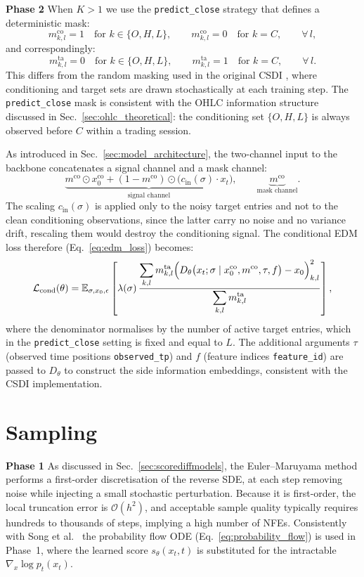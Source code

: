 \textbf{Phase 2} \quad When \(K>1\) we use the \texttt{predict\_close} strategy that defines a deterministic mask:
\[
    m^{\text{co}}_{k,l} = 1 \quad \text{for } k \in \{O,H,L\}, 
    \qquad
    m^{\text{co}}_{k,l} = 0 \quad \text{for } k = C, 
    \qquad \forall\, l,
\]
and correspondingly:
\[
    m^{\text{ta}}_{k,l} = 0 \quad \text{for } k \in \{O,H,L\}, 
    \qquad
    m^{\text{ta}}_{k,l} = 1 \quad \text{for } k = C, 
    \qquad \forall\, l.
\]
This differs from the random masking used in the original CSDI 
\cite{tashiro2021csdi}, where conditioning and target sets are drawn 
stochastically at each training step. The \texttt{predict\_close} mask is consistent with 
the OHLC information structure discussed in 
Sec.\ \ref{sec:ohlc_theoretical}: the conditioning set \(\{O,H,L\}\) 
is always observed before \(C\) within a trading session.

As introduced in Sec.\ \ref{sec:model_architecture}, the two-channel 
input to the backbone concatenates a signal channel and a mask channel:
\[
    \underbrace{m^{\text{co}} \odot x_0^{\text{co}} + 
    (1-m^{\text{co}}) \odot \bigl(c_{\text{in}}(\sigma)\cdot 
    x_t\bigr)}_{\text{signal channel}}, 
    \qquad
    \underbrace{m^{\text{co}}}_{\text{mask channel}}.
\]
The scaling \(c_{\text{in}}(\sigma)\) is applied only to the noisy 
target entries and not to the clean conditioning observations, since the 
latter carry no noise and no variance drift, rescaling them would destroy 
the conditioning signal. The conditional EDM loss therefore (Eq.\ \ref{eq:edm_loss}) becomes:
\[
    \mathcal{L}_{\text{cond}}(\theta) = \mathbb{E}_{\sigma,x_0,\epsilon}
    \left[\lambda(\sigma)\,
    \frac{\displaystyle\sum_{k,l} m^{\text{ta}}_{k,l}
    \Bigl(D_\theta\bigl(x_t;\sigma \mid x^{\text{co}}_0, m^{\text{co}}, 
    \tau, f\bigr) - x_0\Bigr)^2_{k,l}}
    {\displaystyle\sum_{k,l} m^{\text{ta}}_{k,l}}
    \right],
\]
where the denominator normalises by the number of active target entries, 
which in the \texttt{predict\_close} setting is fixed and equal to \(L\). 
The additional arguments \(\tau\) (observed time positions 
\texttt{observed\_tp}) and \(f\) (feature indices \texttt{feature\_id}) 
are passed to \(D_\theta\) to construct the side information embeddings, 
consistent with the CSDI implementation.

\section{Sampling}

\textbf{Phase 1} \quad As discussed in Sec.\ \ref{sec:scorediffmodels}, the Euler--Maruyama
method performs a first-order discretisation of the reverse SDE, at each
step removing noise while injecting a small stochastic perturbation. 
Because it is first-order, the local truncation error is 
\(\mathcal{O}(h^2)\), and acceptable sample quality typically requires 
hundreds to thousands of steps, implying a high number of NFEs. Consistently with Song et al.\ \cite{song2021score} the probability flow ODE (Eq.\ \ref{eq:probability_flow}) is used in Phase~1, where the learned score \(s_\theta(x_t,t)\) is substituted for the 
intractable \(\nabla_x \log p_t(x_t)\).

